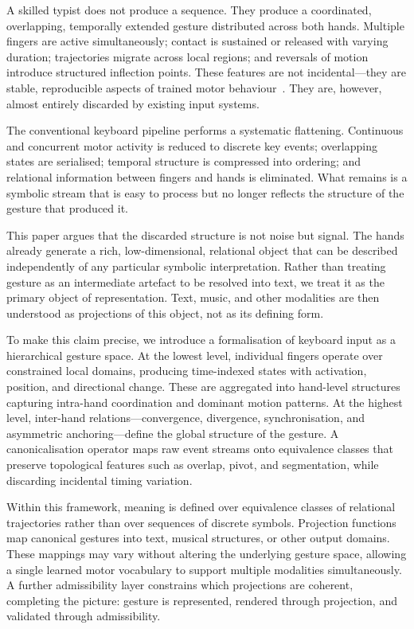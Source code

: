 \documentclass[11pt, a4paper]{article}
\begin{document}
A skilled typist does not produce a sequence. They produce a
coordinated, overlapping, temporally extended gesture distributed across
both hands. Multiple fingers are active simultaneously; contact is
sustained or released with varying duration; trajectories migrate across
local regions; and reversals of motion introduce structured inflection
points. These features are not incidental---they are stable, reproducible
aspects of trained motor behaviour~\cite{lashley1951,schieber2001}. They
are, however, almost entirely discarded by existing input systems.

The conventional keyboard pipeline performs a systematic flattening.
Continuous and concurrent motor activity is reduced to discrete key
events; overlapping states are serialised; temporal structure is
compressed into ordering; and relational information between fingers and
hands is eliminated. What remains is a symbolic stream that is easy to
process but no longer reflects the structure of the gesture that produced it.

This paper argues that the discarded structure is not noise but signal.
The hands already generate a rich, low-dimensional, relational object
that can be described independently of any particular symbolic
interpretation. Rather than treating gesture as an intermediate artefact
to be resolved into text, we treat it as the primary object of
representation. Text, music, and other modalities are then understood as
projections of this object, not as its defining form.

To make this claim precise, we introduce a formalisation of keyboard
input as a hierarchical gesture space. At the lowest level, individual
fingers operate over constrained local domains, producing time-indexed
states with activation, position, and directional change. These are
aggregated into hand-level structures capturing intra-hand coordination
and dominant motion patterns. At the highest level, inter-hand
relations---convergence, divergence, synchronisation, and asymmetric
anchoring---define the global structure of the gesture. A
canonicalisation operator maps raw event streams onto equivalence classes
that preserve topological features such as overlap, pivot, and
segmentation, while discarding incidental timing variation.

Within this framework, meaning is defined over equivalence classes of
relational trajectories rather than over sequences of discrete symbols.
Projection functions map canonical gestures into text, musical
structures, or other output domains. These mappings may vary without
altering the underlying gesture space, allowing a single learned motor
vocabulary to support multiple modalities simultaneously. A further
admissibility layer constrains which projections are coherent, completing
the picture: gesture is represented, rendered through projection, and
validated through admissibility.
\end{document}
